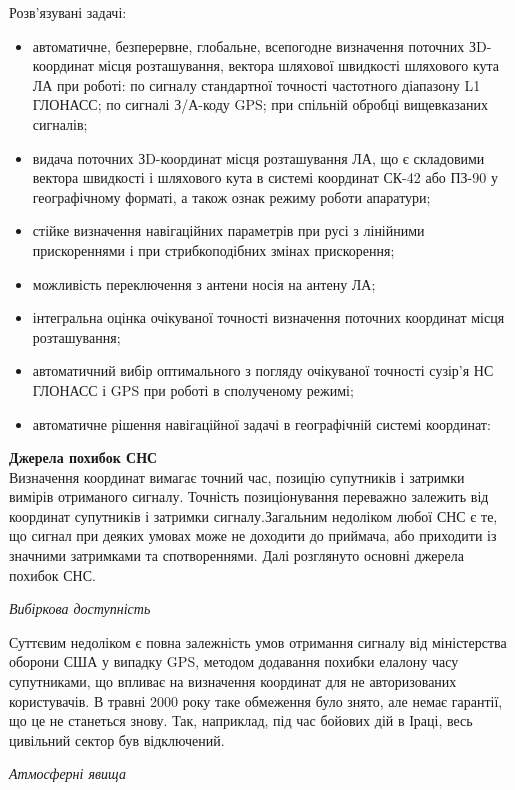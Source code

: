 Розв'язувані задачі:
\begin{itemize}
\item автоматичне, безперервне, глобальне, всепогодне визначення поточних ЗD-координат 
місця розташування, вектора шляхової швидкості шляхового кута ЛА при роботі: по 
сигналу стандартної точності частотного діапазону L1 ГЛОНАСС; по сигналі З/А-коду 
GPS; при спільній обробці вищевказаних сигналів;
\item видача поточних ЗD-координат місця розташування ЛА, що є складовими вектора 
швидкості і шляхового кута в системі координат СК-42 або ПЗ-90 у географічному 
форматі, а також ознак режиму роботи апаратури;
\item стійке визначення навігаційних параметрів при русі з лінійними прискореннями 
і при стрибкоподібних змінах прискорення;
\item  можливість переключення з антени носія на антену ЛА; 
\item інтегральна оцінка очікуваної точності визначення поточних координат місця розташування;
\item автоматичний вибір оптимального з погляду очікуваної точності сузір'я НС ГЛОНАСС і GPS при роботі в сполученому режимі;
\item автоматичне рішення навігаційної задачі в географічній системі координат:  
\end{itemize}

\vspace{5mm}
\textbf{Джерела похибок СНС} \\ 
Визначення координат вимагає точний час, позицію супутників і затримки вимірів 
отриманого сигналу. Точність позиціонування переважно залежить від координат 
супутників і затримки сигналу.Загальним недоліком любої СНС є те, що сигнал при деяких умовах може не доходити 
до приймача, або приходити із значними затримками та спотвореннями. Далі розглянуто 
основні джерела похибок СНС.

\vspace{5mm}
\textit{Вибіркова доступність} 

Суттєвим недоліком є повна залежність умов отримання сигналу від міністерства 
оборони США у випадку GPS, методом додавання похибки елалону часу супутниками, що 
впливає на визначення координат для не авторизованих користувачів. В травні 2000  
року таке обмеження було знято, але немає гарантії, що це не станеться знову. 
Так, наприклад, під час бойових дій в Іраці, весь цивільний сектор був відключений.

\vspace{5mm}
\textit{Атмосферні явища}

